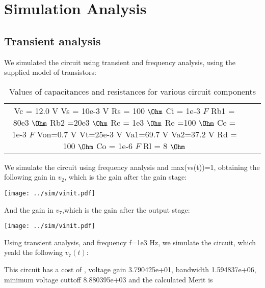 \section{Simulation Analysis}
\label{sec:simulation}

\subsection{Transient analysis}

We simulated the circuit using transient and frequency analysis, using the supplied model of transistors:

\begin{table}[H]
\addtolength{\tabcolsep}{-4pt}
\caption{Values of capacitances and resistances for various circuit components}
\vspace{-3mm}
\begin{tabular}{|c|c|c|}
\hline
Vc = 12.0 V
Vs = 10e-3 V
Rs = 100 $\Ohm$
Ci = 1e-3 $F$
Rb1 = 80e3 $\Ohm$
Rb2 =20e3 $\Ohm$
Rc = 1e3 $\Ohm$
Re =100 $\Ohm$
Ce = 1e-3 $F$
Von=0.7 V
Vt=25e-3 V
Va1=69.7 V
Va2=37.2 V
Rd = 100 $\Ohm$
Co = 1e-6 $F$
Rl = 8 $\Ohm$

\hline
\end{tabular}
\label{tab:Components}
\end{table}

\par

We simulate the circuit using frequency analysis and max(vs(t))=1, obtaining the following gain in $v_2$, which is the gain after the gain stage:

\texttt{[image: ../sim/vinit.pdf]}

And the gain in $v_7$,which is the gain after the output stage:

\texttt{[image: ../sim/vinit.pdf]}

\par

Using transient analysis, and frequency f=1e3 Hz, we simulate the circuit, which yeald the following $v_7(t)$:




This circuit has a cost of , voltage gain 3.790425e+01, bandwidth 1.594837e+06, minimum voltage cuttoff 8.880395e+03 and the  calculated Merit is 



